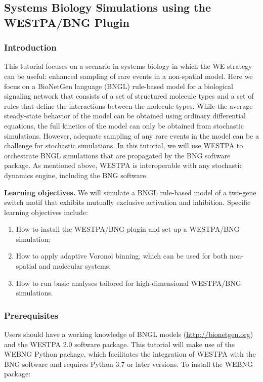 \subsection{Systems Biology Simulations using the WESTPA/BNG Plugin}

\subsubsection{Introduction}
This tutorial focuses on a scenario in systems biology in which the WE strategy can be useful: enhanced sampling of rare events in a non-spatial model. 
Here we focus on a BioNetGen language (BNGL) rule-based model for a biological signaling network that consists of a set of structured molecule types and a set of rules that define the interactions between the molecule types. 
While the average steady-state behavior of the model can be obtained using ordinary differential equations, the full kinetics of the model can only be obtained from stochastic simulations. 
However, adequate sampling of any rare events in the model can be a challenge for stochastic simulations. 
In this tutorial, we will use WESTPA to orchestrate BNGL simulations that are propagated by the BNG software package. 
As mentioned above, WESTPA is interoperable with any stochastic dynamics engine, including the BNG software.

\textbf{Learning objectives.} We will simulate a BNGL rule-based model of a two-gene switch motif that exhibits mutually exclusive activation and inhibition.
Specific learning objectives include:
\begin{enumerate}
    \item How to install the WESTPA/BNG plugin and set up a WESTPA/BNG simulation; 
    \item How to apply adaptive Voronoi binning, which can be used for both non-spatial and molecular systems; 
    \item How to run basic analyses tailored for high-dimensional WESTPA/BNG simulations.
\end{enumerate} 

\subsubsection{Prerequisites}
Users should have a working knowledge of BNGL models ({\url{http://bionetgen.org}}) and the WESTPA 2.0 software package. 
This tutorial will make use of the WEBNG Python package, which facilitates the integration of WESTPA with the BNG software and requires Python 3.7 or later versions. 
To install the WEBNG package: 

